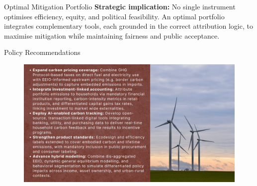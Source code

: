 \documentclass{beamer}
\begin{document}
\begin{frame}{Optimal Mitigation Portfolio}
\footnotesize
 \textbf{Strategic implication:}  
    No single instrument optimises efficiency, equity, and political feasibility.  
    An optimal portfolio integrates complementary tools, each grounded in the correct attribution logic, to maximise mitigation while maintaining fairness and public acceptance.
\end{frame}

\begin{frame}{Policy Recommendations}
  \vspace{-2.5em}
\begin{figure}
\includegraphics[width=\linewidth]{Policy Recommendation.png}
\end{figure}
\end{frame}
\end{document}
